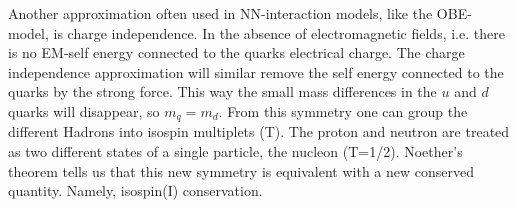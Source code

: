 Another approximation often used in NN-interaction models, like the OBE-model, is charge independence.
In the absence of electromagnetic fields, i.e. there is no EM-self energy connected to the quarks electrical charge.
The charge independence approximation will similar remove the self energy connected to the quarks by the strong force.
This way the small mass differences in the $u$ and $d$ quarks will disappear, so $m_q=m_d$. 
From this symmetry one can group the different Hadrons into isospin multiplets (T).
The proton and neutron are treated as two different states of a single particle, the nucleon (T=1/2).
\nl
Noether's theorem tells us that this new symmetry %
is equivalent with a new conserved quantity. Namely, isospin(I) conservation.

